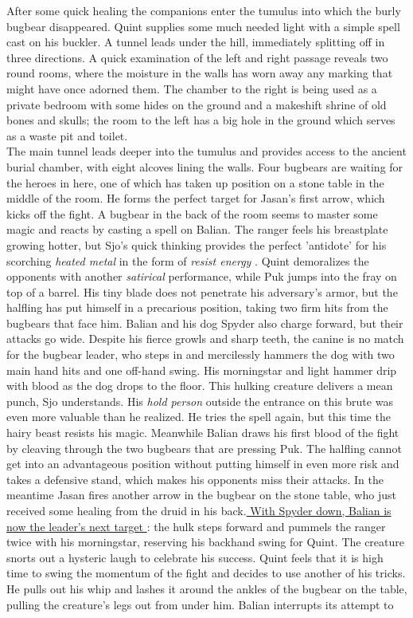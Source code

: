 After some quick healing the companions enter the tumulus into which the burly bugbear disappeared. Quint supplies some much needed light with a simple spell cast on his buckler. A tunnel leads under the hill, immediately splitting off in three directions. A quick examination of the left and right passage reveals two round rooms, where the moisture in the walls has worn away any marking that might have once adorned them. The chamber to the right is being used as a private bedroom with some hides on the ground and a makeshift shrine of old bones and skulls; the room to the left has a big hole in the ground which serves as a waste pit and toilet.\\

The main tunnel leads deeper into the tumulus and provides access to the ancient burial chamber, with eight alcoves lining the walls. Four bugbears are waiting for the heroes in here, one of which has taken up position on a stone table in the middle of the room. He forms the perfect target for Jasan's first arrow, which kicks off the fight. A bugbear in the back of the room seems to master some magic and reacts by casting a spell on Balian. The ranger feels his breastplate growing hotter, but Sjo's quick thinking provides the perfect 'antidote' for his scorching {\itshape heated metal} in the form of  {\itshape resist energy} . Quint demoralizes the opponents with another  {\itshape satirical} performance, while Puk jumps into the fray on top of a barrel. His tiny blade does not penetrate his adversary's armor, but the halfling has put himself in a precarious position, taking two firm hits from the bugbears that face him. Balian and his dog Spyder also charge forward, but their attacks go wide. Despite his fierce growls and sharp teeth, the canine is no match for the bugbear leader, who steps in and mercilessly hammers the dog with two main hand hits and one off-hand swing. His morningstar and light hammer drip with blood as the dog drops to the floor. This hulking creature delivers a mean punch, Sjo understands. His  {\itshape hold person} outside the entrance on this brute was even more valuable than he realized. He tries the spell again, but this time the hairy beast resists his magic. Meanwhile Balian draws his first blood of the fight by cleaving through the two bugbears that are pressing Puk. The halfling cannot get into an advantageous position without putting himself in even more risk and takes a defensive stand, which makes his opponents miss their attacks. In the meantime Jasan fires another arrow in the bugbear on the stone table, who just received some healing from the druid in his back.\hyperref[fig:Shoanti-tumulus-475539806]{ With Spyder down, Balian is now the leader's next target } : the hulk steps forward and pummels the ranger twice with his morningstar, reserving his backhand swing for Quint. The creature snorts out a hysteric laugh to celebrate his success. Quint feels that it is high time to swing the momentum of the fight and decides to use another of his tricks. He pulls out his whip and lashes it around the ankles of the bugbear on the table, pulling the creature's legs out from under him. Balian interrupts its attempt to 